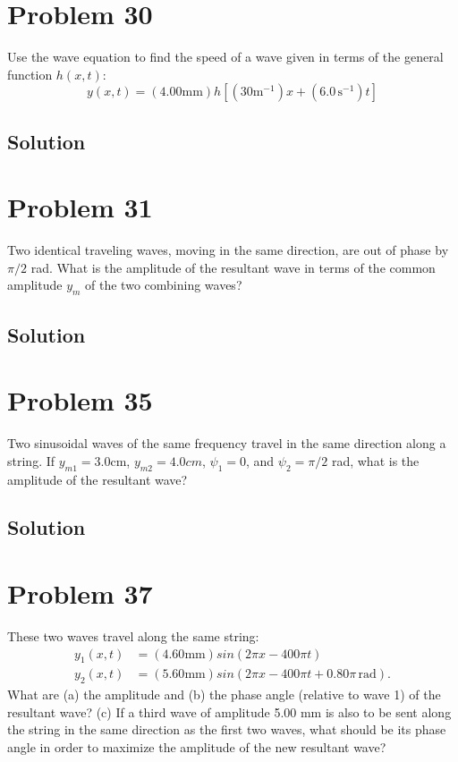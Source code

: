 \documentclass[12pt]{article}
\begin{document}
    \pagebreak
    \section{Problem 30}
        Use the wave equation to find the speed of a wave given in terms of the general function $h(x, t)$:
        \begin{equation}
            y(x, t) = (4.00 \unit{\milli\meter}) h[(30 \unit{\meter^{-1}})x + (6.0\,\unit{\second^{-1}})t]
        \end{equation}

        \subsection{Solution}

    \section{Problem 31}
        Two identical traveling waves, moving in the same direction, are out of phase by $\pi/2$ rad. 
        What is the amplitude of the resultant wave in terms of the common amplitude $y_m$ of the two combining waves?

        \subsection{Solution}

    \section{Problem 35}
        Two sinusoidal waves of the same frequency travel in the same direction along a string. 
        If $y_{m1} = 3.0 \unit{\centi\meter}$, $y_{m2} = 4.0 cm$, $\psi_1 = 0$, and $\psi_2 = \pi/2$ rad, what is the amplitude of the resultant wave?

        \subsection{Solution}

    \section{Problem 37}
        These two waves travel along the same string:
        \begin{align}
            y_1(x, t)   &=  (4.60 \unit{\milli\meter}) sin(2\pi x - 400\pi t)\\
            y_2(x, t)   &=  (5.60 \unit{\milli\meter}) sin(2\pi x - 400\pi t + 0.80\pi\,\unit{\radian}).
        \end{align}
        What are (a) the amplitude and (b) the phase angle (relative to wave 1) of the resultant wave? 
        (c) If a third wave of amplitude 5.00 mm is also to be sent along the string in the same direction as the first two waves, what should be its phase angle in order to maximize the amplitude of the new resultant wave?
\end{document}
